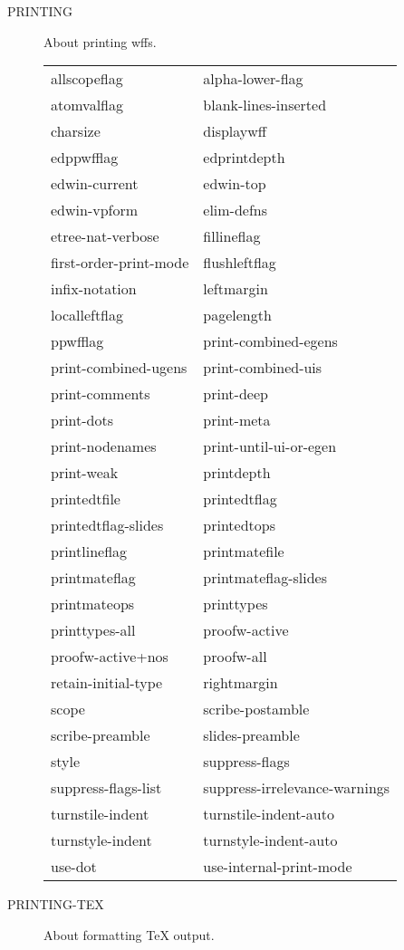 \begin{description} 
\item[PRINTING]  
About printing wffs.

\begin{tabular}{l l}
allscopeflag&alpha-lower-flag\\
atomvalflag&blank-lines-inserted\\
charsize&displaywff\\
edppwfflag&edprintdepth\\
edwin-current&edwin-top\\
edwin-vpform&elim-defns\\
etree-nat-verbose&fillineflag\\
first-order-print-mode&flushleftflag\\
infix-notation&leftmargin\\
localleftflag&pagelength\\
ppwfflag&print-combined-egens\\
print-combined-ugens&print-combined-uis\\
print-comments&print-deep\\
print-dots&print-meta\\
print-nodenames&print-until-ui-or-egen\\
print-weak&printdepth\\
printedtfile&printedtflag\\
printedtflag-slides&printedtops\\
printlineflag&printmatefile\\
printmateflag&printmateflag-slides\\
printmateops&printtypes\\
printtypes-all&proofw-active\\
proofw-active+nos&proofw-all\\
retain-initial-type&rightmargin\\
scope&scribe-postamble\\
scribe-preamble&slides-preamble\\
style&suppress-flags\\
suppress-flags-list&suppress-irrelevance-warnings\\
turnstile-indent&turnstile-indent-auto\\
turnstyle-indent&turnstyle-indent-auto\\
use-dot&use-internal-print-mode\\
\end{tabular}

\item[PRINTING-TEX]  
About formatting TeX output.


\end{description}
